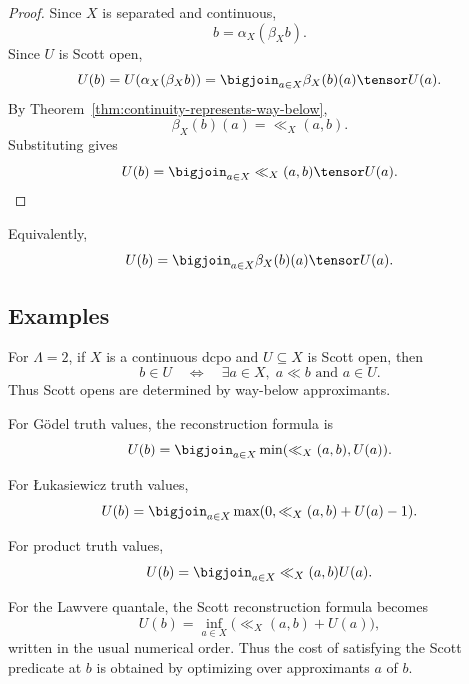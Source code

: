 \begin{proof}
Since \(X\) is separated and continuous,
\[
    b=\alpha_X(\beta_X b).
\]
Since \(U\) is Scott open,
\[
    U(b)
    =
    U(\alpha_X(\beta_X b))
    =
    \bigjoin_{a\in X}
    \beta_X(b)(a)\tensor U(a).
\]
By Theorem~\ref{thm:continuity-represents-way-below},
\[
    \beta_X(b)(a)=\ll_X(a,b).
\]
Substituting gives
\[
    U(b)
    =
    \bigjoin_{a\in X}
    \ll_X(a,b)\tensor U(a).
\]
\end{proof}

Equivalently,
\[
    U(b)
    =
    \bigjoin_{a\in X}
    \beta_X(b)(a)\tensor U(a).
\]

\subsection{Examples}
\label{subsec:scott-opens-way-below-examples}

\begin{example}
\label{ex:scott-opens-way-below-crisp}
For \(\Lambda=2\), if \(X\) is a continuous dcpo and \(U\subseteq X\) is Scott
open, then
\[
    b\in U
    \quad\Longleftrightarrow\quad
    \exists a\in X,\; a\ll b\text{ and }a\in U.
\]
Thus Scott opens are determined by way-below approximants.
\end{example}

\begin{example}
\label{ex:scott-opens-way-below-godel}
For G\"odel truth values, the reconstruction formula is
\[
    U(b)
    =
    \bigjoin_{a\in X}
    \min(\ll_X(a,b),U(a)).
\]
\end{example}

\begin{example}
\label{ex:scott-opens-way-below-lukasiewicz}
For {\L}ukasiewicz truth values,
\[
    U(b)
    =
    \bigjoin_{a\in X}
    \max(0,\ll_X(a,b)+U(a)-1).
\]
\end{example}

\begin{example}
\label{ex:scott-opens-way-below-product}
For product truth values,
\[
    U(b)
    =
    \bigjoin_{a\in X}
    \ll_X(a,b)U(a).
\]
\end{example}

\begin{example}
\label{ex:scott-opens-way-below-lawvere}
For the Lawvere quantale, the Scott reconstruction formula becomes
\[
    U(b)
    =
    \inf_{a\in X}
    \bigl(\ll_X(a,b)+U(a)\bigr),
\]
written in the usual numerical order. Thus the cost of satisfying the Scott
predicate at \(b\) is obtained by optimizing over approximants \(a\) of \(b\).
\end{example}


